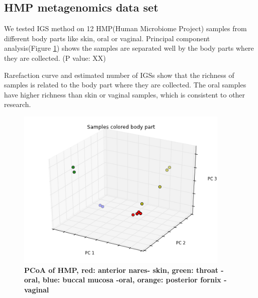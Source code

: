 

\subsection{HMP metagenomics data set}

We tested IGS method on 12 HMP(Human Microbiome Project) samples from 
different body parts like skin, oral or vaginal. 
Principal component analysis(Figure \ref{fig:HMP_beta}) shows the samples are 
separated well by the body parts where they are collected. (P value: XX)

Rarefaction curve and estimated number of IGSs show that the richness of 
samples is related to the body part where they are collected. The 
oral samples have higher richness than skin or vaginal samples, 
which is consistent  to other research. \cite{Human-Microbiome-Project-Consortium:2012aa}



\begin{figure}[!ht]
 \centerline{\includegraphics[width=4in]{./figures/HMP_beta.png}}
\caption{\bf PCoA of HMP, red: anterior nares- skin, green: throat -oral, blue: buccal mucosa -oral, orange: 
posterior fornix -vaginal}
\label{fig:HMP_beta}
\end{figure}

